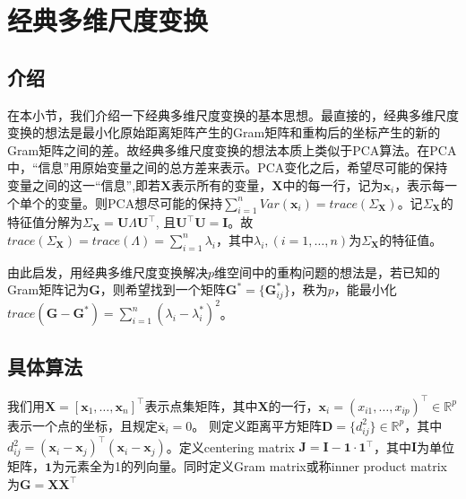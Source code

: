 \chapter{经典多维尺度变换}
\label{cha:classMDS}


\section{介绍}
在本小节，我们介绍一下经典多维尺度变换的基本思想。最直接的，经典多维尺度变换的想法是最小化原始距离矩阵产生的Gram矩阵和重构后的坐标产生的新的Gram矩阵之间的差。故经典多维尺度变换的想法本质上类似于PCA算法。在PCA中，“信息”用原始变量之间的总方差来表示。PCA变化之后，希望尽可能的保持变量之间的这一“信息”,即若$\mathbf{X}$表示所有的变量，$\mathbf{X}$中的每一行，记为$\mathbf{x}_i$，表示每一个单个的变量。则PCA想尽可能的保持$\sum_{i=1}^nVar(\mathbf{x}_i) = trace(\Sigma_{\mathbf{X}})$。记$\Sigma_{\mathbf{X}}$的特征值分解为$\Sigma_{\mathbf{X}} = \mathbf{U}\Lambda\mathbf{U}^\intercal$, 且$\mathbf{U}^\intercal\mathbf{U} = \mathbf{I}$。故$trace(\Sigma_{\mathbf{X}}) = trace(\Lambda) = \sum_{i=1}^n\lambda_i$，其中$\lambda_i, (i=1, \dots, n)$为$\Sigma_{\mathbf{X}}$的特征值。

由此启发，用经典多维尺度变换解决$p$维空间中的重构问题的想法是，若已知的Gram矩阵记为$\mathbf{G}$，则希望找到一个矩阵$\mathbf{G}^* = \{\mathbf{G}^*_{ij}\}$，秩为$p$，能最小化$trace(\mathbf{G} - \mathbf{G}^*) = \sum_{i=1}^n(\lambda_i - \lambda_i^*)^2$。

\section{具体算法}
我们用$\mathbf{X} = [\mathbf{x}_1, \dots, \mathbf{x}_n]^\intercal$表示点集矩阵，其中$\mathbf{X}$的一行，$\mathbf{x}_i = (x_{i1}, \dots, x_{ip})^\intercal\in\mathbb{R}^p$表示一个点的坐标，且规定$\bar{\mathbf{x}}_i = 0$。
则定义距离平方矩阵$\mathbf{D} = \{d_{ij}^2\}\in\mathbb{R}^p$，其中$d_{ij}^2 = (\mathbf{x}_i - \mathbf{x}_j)^\intercal(\mathbf{x}_i - \mathbf{x}_j)$。定义centering matrix $\mathbf{J} = \mathbf{I} - \mathbf{1}\cdot\mathbf{1}^\intercal$，其中$\mathbf{I}$为单位矩阵，$\mathbf{1}$为元素全为1的列向量。同时定义Gram matrix或称inner product matrix为$\mathbf{G = XX^\intercal}$

